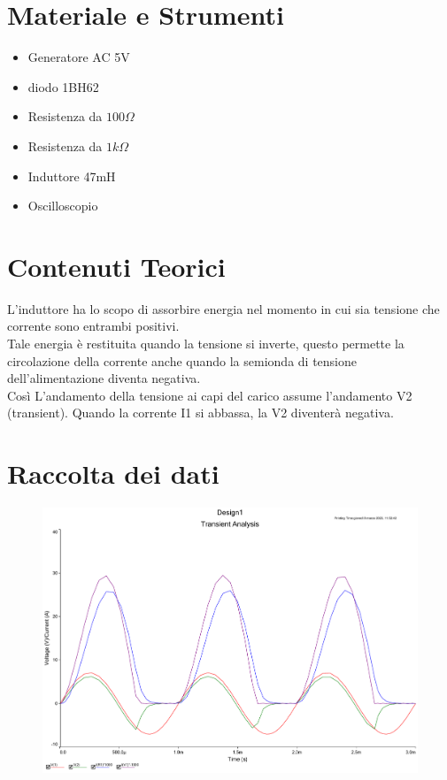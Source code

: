 \documentclass[12pt]{article}
\begin{document}
\section{Materiale e Strumenti}
\begin{multicols}{2}
	\begin{itemize}
		\item Generatore AC 5V
		\item diodo 1BH62
		\item Resistenza da $100\Omega$
		\item Resistenza da $1k\Omega$
		\item Induttore 47mH
	\end{itemize}
	\vfill\null
	\columnbreak
	\begin{itemize}
		\item Oscilloscopio
	\end{itemize}
	\vfill\null
\end{multicols}

\section{Contenuti Teorici}
L'induttore ha lo scopo di assorbire energia nel momento in cui sia tensione che corrente sono entrambi
positivi.\\ Tale energia è restituita quando la tensione si inverte, questo permette la circolazione della
corrente anche quando la semionda di tensione dell'alimentazione diventa negativa. \\
Così L'andamento della tensione ai capi del carico assume l'andamento V2 (transient).
Quando la corrente I1 si abbassa, la V2 diventerà negativa.\\
\section{Raccolta dei dati}
\begin{figure}[H]
	\includegraphics[scale=0.5]{osc.pdf}
\end{figure}
\end{document}
